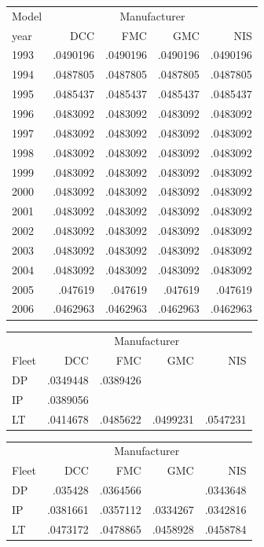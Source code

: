 \begin{tabular}{lrrrr}
\toprule
Model & \multicolumn{4}{c}{Manufacturer} \\
year & DCC & FMC & GMC & NIS \\
\midrule
1993 & .0490196 & .0490196 & .0490196 & .0490196 \\
1994 & .0487805 & .0487805 & .0487805 & .0487805 \\
1995 & .0485437 & .0485437 & .0485437 & .0485437 \\
1996 & .0483092 & .0483092 & .0483092 & .0483092 \\
1997 & .0483092 & .0483092 & .0483092 & .0483092 \\
1998 & .0483092 & .0483092 & .0483092 & .0483092 \\
1999 & .0483092 & .0483092 & .0483092 & .0483092 \\
2000 & .0483092 & .0483092 & .0483092 & .0483092 \\
2001 & .0483092 & .0483092 & .0483092 & .0483092 \\
2002 & .0483092 & .0483092 & .0483092 & .0483092 \\
2003 & .0483092 & .0483092 & .0483092 & .0483092 \\
2004 & .0483092 & .0483092 & .0483092 & .0483092 \\
2005 & .047619 & .047619 & .047619 & .047619 \\
2006 & .0462963 & .0462963 & .0462963 & .0462963 \\
\bottomrule
\end{tabular}

\begin{tabular}{lrrrr}
\toprule
 & \multicolumn{4}{c}{Manufacturer} \\
Fleet & DCC & FMC & GMC & NIS \\
\midrule
DP & .0349448 & .0389426 &  &  \\
IP & .0389056 &  &  &  \\
LT & .0414678 & .0485622 & .0499231 & .0547231 \\
\bottomrule
\end{tabular}

\begin{tabular}{lrrrr}
\toprule
 & \multicolumn{4}{c}{Manufacturer} \\
Fleet & DCC & FMC & GMC & NIS \\
\midrule
DP & .035428 & .0364566 &  & .0343648 \\
IP & .0381661 & .0357112 & .0334267 & .0342816 \\
LT & .0473172 & .0478865 & .0458928 & .0458784 \\
\bottomrule
\end{tabular}
